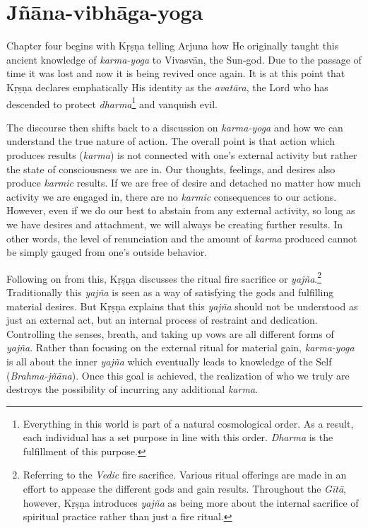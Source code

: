 \chapter{Jñāna-vibhāga-yoga}\label{chap-jnana-vibhaga-yoga}

\noindent Chapter four begins with Kṛṣṇa telling Arjuna how He originally taught this ancient knowledge of \textit{karma-yoga} to Vivasvān, the Sun-god. Due to the passage of time it was lost and now it is being revived once again. It is at this point that Kṛṣṇa declares emphatically His identity as the \textit{avatāra}, the Lord who has descended to protect \textit{dharma}\footnote{Everything in this world is part of a natural cosmological order. As a result, each individual has a set purpose in line with this order. \textit{Dharma} is the fulfillment of this purpose.} and vanquish evil.

The discourse then shifts back to a discussion on \textit{karma-yoga} and how we can understand the true nature of action. The overall point is that action which produces results (\textit{karma}) is not connected with one’s external activity but rather the state of consciousness we are in. Our thoughts, feelings, and desires also produce \textit{karmic} results. If we are free of desire and detached no matter how much activity we are engaged in, there are no \textit{karmic} consequences to our actions. However, even if we do our best to abstain from any external activity, so long as we have desires and attachment, we will always be creating further results. In other words, the level of renunciation and the amount of \textit{karma} produced cannot be simply gauged from one’s outside behavior.

Following on from this, Kṛṣṇa discusses the ritual fire sacrifice or \textit{yajña}.\footnote{Referring to the \textit{Vedic} fire sacrifice. Various ritual offerings are made in an effort to appease the different gods and gain results. Throughout the \textit{Gītā}, however, Kṛṣṇa introduces \textit{yajña} as being more about the internal sacrifice of spiritual practice rather than just a fire ritual.} Traditionally this \textit{yajña} is seen as a way of satisfying the gods and fulfilling material desires. But Kṛṣṇa explains that this \textit{yajña} should not be understood as just an external act, but an internal process of restraint and dedication. Controlling the senses, breath, and taking up vows are all different forms of \textit{yajña}. Rather than focusing on the external ritual for material gain, \textit{karma-yoga} is all about the inner \textit{yajña} which eventually leads to knowledge of the Self (\textit{Brahma-jñāna}). Once this goal is achieved, the realization of who we truly are destroys the possibility of incurring any additional \textit{karma}.

